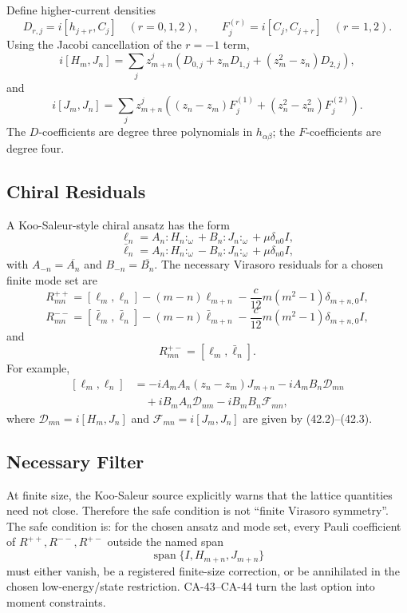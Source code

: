 Define higher-current densities
\[
  D_{r,j}=i[h_{j+r},C_j]\quad(r=0,1,2),
  \qquad
  F^{(r)}_j=i[C_j,C_{j+r}]\quad(r=1,2).
\]
Using the Jacobi cancellation of the \(r=-1\) term,
\[
  i[H_m,J_n]
  =
  \sum_jz_{m+n}^j
  \left(D_{0,j}+z_mD_{1,j}+(z_m^2-z_n)D_{2,j}\right),
  \tag{42.2}
\]
and
\[
  i[J_m,J_n]
  =
  \sum_jz_{m+n}^j
  \left((z_n-z_m)F^{(1)}_j
       +(z_n^2-z_m^2)F^{(2)}_j\right).
  \tag{42.3}
\]
The \(D\)-coefficients are degree three polynomials in \(h_{\alpha\beta}\);
the \(F\)-coefficients are degree four.

\subsection{Chiral Residuals}

A Koo-Saleur-style chiral ansatz has the form
\[
  \ell_n=A_n{:}H_n{:}_\omega+B_n{:}J_n{:}_\omega+\mu\delta_{n0}I,
\]
\[
  \bar\ell_n=A_n{:}H_n{:}_\omega-B_n{:}J_n{:}_\omega+\mu\delta_{n0}I,
\]
with \(A_{-n}=\overline{A_n}\) and \(B_{-n}=\overline{B_n}\).  The necessary
Virasoro residuals for a chosen finite mode set are
\[
  R^{++}_{mn}=
  [\ell_m,\ell_n]-(m-n)\ell_{m+n}
  -\frac{c}{12}m(m^2-1)\delta_{m+n,0}I,
  \tag{42.4}
\]
\[
  R^{--}_{mn}=
  [\bar\ell_m,\bar\ell_n]-(m-n)\bar\ell_{m+n}
  -\frac{c}{12}m(m^2-1)\delta_{m+n,0}I,
  \tag{42.5}
\]
and
\[
  R^{+-}_{mn}=[\ell_m,\bar\ell_n].
  \tag{42.6}
\]
For example,
\[
\begin{aligned}
  [\ell_m,\ell_n]
  &=
  -iA_mA_n(z_n-z_m)J_{m+n}
  -iA_mB_n\mathcal D_{mn}\\
  &\quad
  +iB_mA_n\mathcal D_{nm}
  -iB_mB_n\mathcal F_{mn},
\end{aligned}
\]
where \(\mathcal D_{mn}=i[H_m,J_n]\) and
\(\mathcal F_{mn}=i[J_m,J_n]\) are given by (42.2)--(42.3).

\subsection{Necessary Filter}

At finite size, the Koo-Saleur source explicitly warns that the lattice
quantities need not close.  Therefore the safe condition is not ``finite
Virasoro symmetry''.  The safe condition is:
for the chosen ansatz and mode set, every Pauli coefficient of
\(R^{++},R^{--},R^{+-}\) outside the named span
\[
  \operatorname{span}\{I,H_{m+n},J_{m+n}\}
\]
must either vanish, be a registered finite-size correction, or be annihilated in
the chosen low-energy/state restriction.  CA-43--CA-44 turn the last option into
moment constraints.

